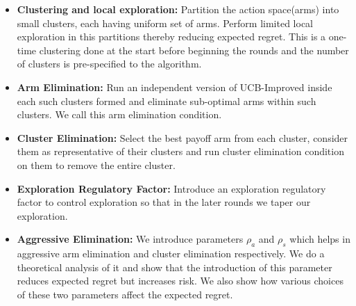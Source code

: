 \begin{itemize}
\item \textbf{Clustering and local exploration:} Partition the action space(arms) into small clusters, each having uniform set of arms. Perform limited local exploration in this partitions thereby reducing expected regret. This is a one-time clustering done at the start before beginning the rounds and the number of clusters is pre-specified to the algorithm.
\item \textbf{Arm Elimination:} Run an independent version of UCB-Improved inside each such clusters formed and eliminate sub-optimal arms within such clusters. We call this arm elimination condition.
\item \textbf{Cluster Elimination:} Select the best payoff arm from each cluster, consider them as representative of their clusters and run cluster elimination condition on them to remove the entire cluster.
\item \textbf{Exploration Regulatory Factor:} Introduce an exploration regulatory factor to control exploration so that in the later rounds we taper our exploration.
\item \textbf{Aggressive Elimination:} We introduce parameters $\rho_{a}$ and $\rho_{s}$ which helps in aggressive arm elimination and cluster elimination respectively. We do a theoretical analysis of it and show that the introduction of this parameter reduces expected regret but increases risk. We also show how various choices of these two parameters affect the expected regret.
\end{itemize}

